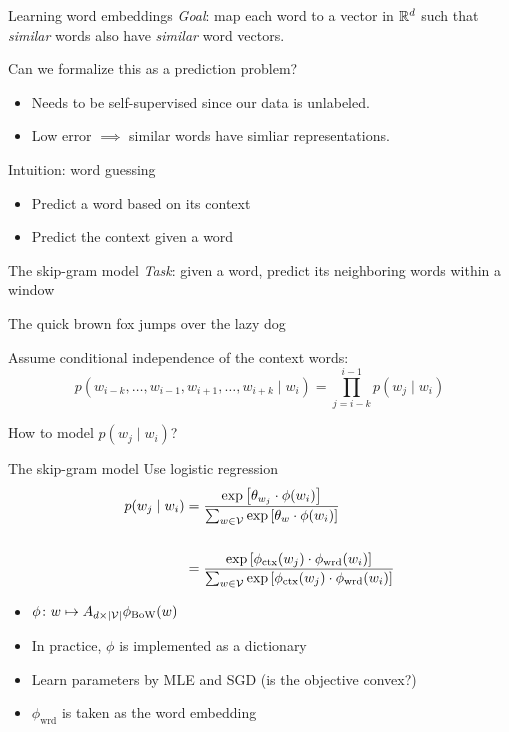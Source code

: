 \documentclass[usenames,dvipsnames,notes]{beamer}
\begin{document}
\begin{frame}
    {Learning word embeddings}
    \emph{Goal}: map each word to a vector in $\mathbb{R}^d$ such that \textit{similar} words also have \textit{similar} word vectors.
    \vspace{1em}

    Can we formalize this as a prediction problem?\\
    \begin{itemize}
        \item Needs to be self-supervised since our data is unlabeled.
        \item Low error $\implies$ similar words have simliar representations.
    \end{itemize}
    \vspace{1em}

    Intuition: word guessing\\
    \begin{itemize}
        \item Predict a word based on its context
        \item Predict the context given a word
    \end{itemize}
\end{frame}

\begin{frame}
    {The skip-gram model}
    \emph{Task}: given a word, predict its neighboring words within a window
    \begin{center}
        The quick brown fox jumps over the lazy dog
    \end{center}

    Assume conditional independence of the context words:
    $$
    p(w_{i-k}, \ldots, w_{i-1}, w_{i+1}, \ldots, w_{i+k} \mid w_i) =
 \prod_{j=i-k}^{i-1}p(w_j\mid w_i)
    $$

    How to model $p(w_j\mid w_i)$?
\end{frame}

\begin{frame}
    {The skip-gram model}
    Use logistic regression\\
    \begin{align*}
        p(w_j\mid w_i) &= \frac{\exp\left[ \theta_{w_j}\cdot \phi(w_i) \right]}
    {\sum_{w\in\mathcal{V}} \exp\left[ \theta_{w}\cdot\phi(w_i) \right]} \\\\
        &= \frac{\exp\left[ \phi_{\text{ctx}}(w_j)\cdot \phi_{\text{wrd}}(w_i) \right]}
        {\sum_{w\in\mathcal{V}} \exp\left[ \phi_{\text{ctx}}(w_j)\cdot\phi_{\text{wrd}}(w_i) \right]} \\
    \end{align*}
    \begin{itemize}
        \item $\phi\colon w \mapsto A_{d\times|\mathcal{V}|}\phi_{\text{BoW}}(w)$
        \item In practice, $\phi$ is implemented as a dictionary
        \item Learn parameters by MLE and SGD (is the objective convex?)
        \item $\phi_{\text{wrd}}$ is taken as the word embedding
    \end{itemize}
\end{frame}
\end{document}
